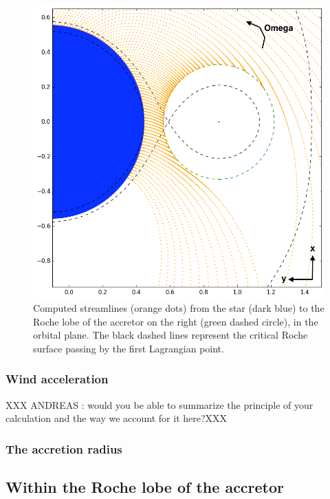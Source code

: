 \documentclass[a4paper,fleqn,usenatbib]{mnras}
\begin{document}
\begin{figure}
\centering
\includegraphics[width=0.9\columnwidth]{Pictures/big_picture.png}
\caption{Computed streamlines (orange dots) from the star (dark blue) to the Roche lobe of the accretor on the right (green dashed circle), in the orbital plane. The black dashed lines represent the critical Roche surface passing by the first Lagrangian point.}
\label{fig:big_picture}
\end{figure} 


\subsubsection{Wind acceleration}
\label{sec:wind_acc}
XXX ANDREAS : would you be able to summarize the principle of your calculation and the way we account for it here?XXX 

\subsubsection{The accretion radius}
\label{sec:acc_rad}

\subsection{Within the Roche lobe of the accretor}
\label{sec:Roche_lobe}
\end{document}
